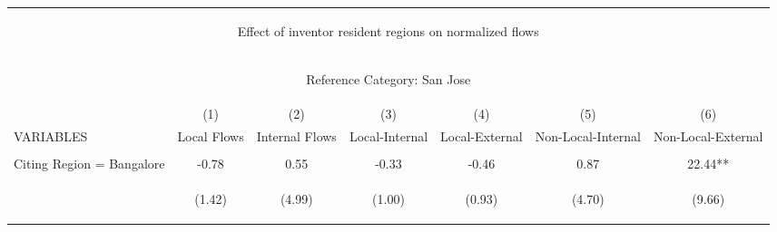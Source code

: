 \begin{center}
\begin{tabular}{lcccccc}
\multicolumn{7}{c}{\begin{large}Effect of inventor resident regions on normalized flows\end{large}} \\
\multicolumn{7}{c}{\begin{large}Reference Category: San Jose \label{small}\end{large}} \\ \hline
 & (1) & (2) & (3) & (4) & (5) & (6) \\
VARIABLES & Local Flows & Internal Flows & Local-Internal & Local-External & Non-Local-Internal & Non-Local-External \\ \hline
\vspace{4pt} & \begin{footnotesize}\end{footnotesize} & \begin{footnotesize}\end{footnotesize} & \begin{footnotesize}\end{footnotesize} & \begin{footnotesize}\end{footnotesize} & \begin{footnotesize}\end{footnotesize} & \begin{footnotesize}\end{footnotesize} \\
Citing Region = Bangalore & -0.78 & 0.55 & -0.33 & -0.46 & 0.87 & 22.44** \\
\vspace{4pt} & \begin{footnotesize}(1.42)\end{footnotesize} & \begin{footnotesize}(4.99)\end{footnotesize} & \begin{footnotesize}(1.00)\end{footnotesize} & \begin{footnotesize}(0.93)\end{footnotesize} & \begin{footnotesize}(4.70)\end{footnotesize} & \begin{footnotesize}(9.66)\end{footnotesize} \\

\end{tabular}
\end{center}
